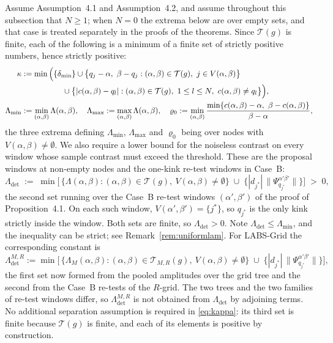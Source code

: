 \documentclass[12pt, a4paper]{article}
\newcommand{\assterm}{Assumption~4.1}
\newcommand{\assnondeg}{Assumption~4.2}
\newcommand{\proppop}{Proposition~4.1}
\begin{document}
Assume \assterm{} and \assnondeg{}, and assume throughout this subsection that $N \ge 1$; when $N = 0$ the extrema below are over empty sets, and that case is treated separately in the proofs of the theorems. Since $\mathcal{T}(g)$ is finite, each of the following is a minimum of a finite set of strictly positive numbers, hence strictly positive:
\begin{align}
\label{eq:kappa}
\kappa &:= \min\Big( \{\delta_{\min}\} \cup
\big\{ q_j - \alpha,\ \beta - q_j : (\alpha,\beta) \in \mathcal{T}(g),\
j \in V(\alpha,\beta) \big\} \notag\\
&\hspace{5.2em} \cup \big\{ |c(\alpha,\beta) - q_l| :
(\alpha,\beta)\in\mathcal{T}(g),\ 1 \le l \le N,\
c(\alpha,\beta) \ne q_l \big\} \Big), \\
\Lambda_{\min} &:= \min_{(\alpha,\beta)} \Lambda(\alpha,\beta), \quad \Lambda_{\max} := \max_{(\alpha,\beta)} \Lambda(\alpha,\beta), \quad \varrho_0 := \min_{(\alpha,\beta)} \frac{\min\{c(\alpha,\beta)-\alpha,\ \beta - c(\alpha,\beta)\}}{\beta-\alpha},
\end{align}
the three extrema defining $\Lambda_{\min}$, $\Lambda_{\max}$ and $\varrho_0$
being over nodes with $V(\alpha,\beta)\ne\emptyset$. We also require a lower
bound for the noiseless contrast on every window whose sample contrast must
exceed the threshold. These are the proposal windows at non-empty nodes and
the one-kink re-test windows in Case~B:
\begin{equation}
\label{eq:Lamdet}
\Lambda_{\mathrm{det}} \;:=\; \min\Big[\, \big\{ \Lambda(\alpha,\beta) : (\alpha,\beta) \in \mathcal{T}(g),\ V(\alpha,\beta) \ne \emptyset \big\}
\;\cup\; \big\{ |d_{j^*}| \, \|\Psi^{\alpha'\beta'}_{q_{j^*}}\| \big\} \Big] \;>\; 0,
\end{equation}
the second set running over the Case~B re-test windows $(\alpha',\beta')$ of
the proof of \proppop{}. On each such window,
$V(\alpha',\beta')=\{j^*\}$, so $q_{j^*}$ is the only kink strictly inside the
window. Both sets are finite, so $\Lambda_{\mathrm{det}}>0$. Note
$\Lambda_{\mathrm{det}}\le\Lambda_{\min}$, and the inequality can be strict;
see Remark~\ref{rem:uniformlam}. For LABS-Grid the corresponding constant is
\begin{equation}
\label{eq:LamdetMR}
\Lambda^{M,R}_{\mathrm{det}} := \min\Big[\, \big\{ \Lambda_M(\alpha,\beta) : (\alpha,\beta) \in \mathcal{T}_{M,R}(g),\ V(\alpha,\beta) \ne \emptyset \big\} \;\cup\; \big\{ |d_{j^*}|\,\|\Psi^{\alpha'\beta'}_{q_{j^*}}\| \big\} \Big],
\end{equation}
the first set now formed from the pooled amplitudes over the grid tree and the
second from the Case~B re-tests of the $R$-grid. The two trees and the two
families of re-test windows differ, so $\Lambda^{M,R}_{\mathrm{det}}$ is not
obtained from $\Lambda_{\mathrm{det}}$ by adjoining terms. No additional
separation assumption is required in \eqref{eq:kappa}: its third set is finite
because $\mathcal{T}(g)$ is finite, and each of its elements is positive by
construction.
\end{document}
